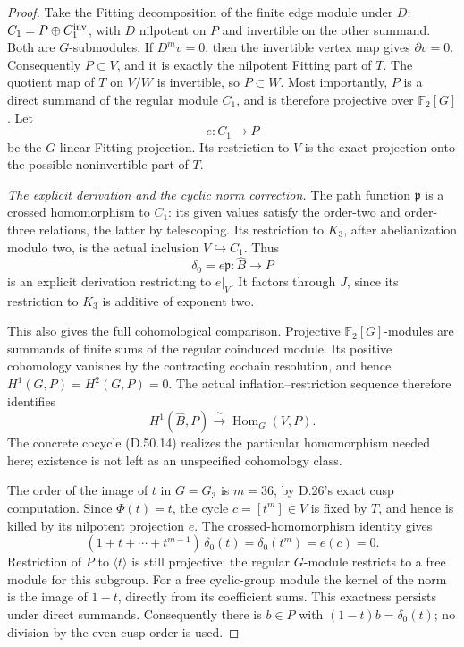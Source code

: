 \begin{proof}
Take the Fitting decomposition of the finite
edge module under \(D\):
\(C_1=P\oplus C_1^{\rm inv}\), with \(D\) nilpotent
on \(P\) and invertible on the other summand.
Both are \(G\)-submodules. If \(D^m v=0\), then
the invertible vertex map gives \(\partial v=0\).
Consequently \(P\subset V\), and it is exactly
the nilpotent Fitting part of \(T\). The quotient
map of \(T\) on \(V/W\) is invertible, so
\(P\subset W\). Most importantly, \(P\) is a
direct summand of the regular module \(C_1\),
and is therefore projective over \(\mathbb F_2[G]\).
Let
\[
                  e:C_1\longrightarrow P
 \tag{D.50.13}
\]
be the \(G\)-linear Fitting projection. Its
restriction to \(V\) is the exact projection
onto the possible noninvertible part of \(T\).

\emph{The explicit derivation and the cyclic norm correction.}
The path function \(\mathfrak p\) is a crossed
homomorphism to \(C_1\): its given values satisfy
the order-two and order-three relations, the
latter by telescoping. Its restriction to
\(K_3\), after abelianization modulo two, is
the actual inclusion \(V\hookrightarrow C_1\).
Thus
\[
          \delta_0=e\mathfrak p:\widehat B\longrightarrow P
 \tag{D.50.14}
\]
is an explicit derivation restricting to \(e|_V\).
It factors through \(J\), since its restriction
to \(K_3\) is additive of exponent two.

This also gives the full cohomological comparison.
Projective \(\mathbb F_2[G]\)-modules are summands
of finite sums of the regular coinduced module.
Its positive cohomology vanishes by the contracting
cochain resolution, and hence
\(H^1(G,P)=H^2(G,P)=0\).
The actual inflation--restriction sequence therefore
identifies
\[
                  H^1(\widehat B,P)
                     \xrightarrow{\ \sim\ }
                         \operatorname{Hom}_G(V,P).
 \tag{D.50.15}
\]
The concrete cocycle (D.50.14) realizes the
particular homomorphism needed here; existence
is not left as an unspecified cohomology class.

The order of the image of \(t\) in \(G=G_3\)
is \(m=36\), by D.26's exact cusp computation.
Since \(\Phi(t)=t\), the cycle
\(c=[t^m]\in V\) is fixed by \(T\), and hence
is killed by its nilpotent projection \(e\).
The crossed-homomorphism identity gives
\[
       (1+t+\cdots+t^{m-1})\,\delta_0(t)
                         =\delta_0(t^m)=e(c)=0.
 \tag{D.50.16}
\]
Restriction of \(P\) to \(\langle t\rangle\)
is still projective: the regular \(G\)-module
restricts to a free module for this subgroup.
For a free cyclic-group module the kernel of
the norm is the image of \(1-t\), directly
from its coefficient sums. This exactness
persists under direct summands. Consequently
there is \(b\in P\) with
\((1-t)b=\delta_0(t)\); no division by the
even cusp order is used.


\end{proof}
